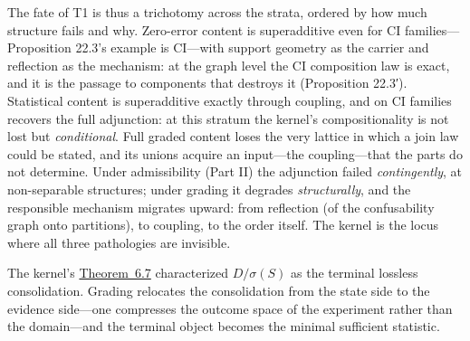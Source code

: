 The fate of T1 is thus a trichotomy across the strata, ordered by how much structure fails and why. Zero-error content is superadditive even for CI families---\hspace{0pt}Proposition 22.3's example is CI---\hspace{0pt}with support geometry as the carrier and reflection as the mechanism: at the graph level the CI composition law is exact, and it is the passage to components that destroys it (Proposition 22.3′). Statistical content is superadditive exactly through coupling, and on CI families recovers the full adjunction: at this stratum the kernel's compositionality is not lost but \emph{conditional}. Full graded content loses the very lattice in which a join law could be stated, and its unions acquire an input---\hspace{0pt}the coupling---\hspace{0pt}that the parts do not determine. Under admissibility (Part II) the adjunction failed \emph{contingently}, at non-separable structures; under grading it degrades \emph{structurally}, and the responsible mechanism migrates upward: from reflection (of the confusability graph onto partitions), to coupling, to the order itself. The kernel is the locus where all three pathologies are invisible.


The kernel's \hyperlink{stmt:6.7}{Theorem~6.7} characterized \(D/\sigma(S)\) as the terminal lossless consolidation. Grading relocates the consolidation from the state side to the evidence side---\hspace{0pt}one compresses the outcome space of the experiment rather than the domain---\hspace{0pt}and the terminal object becomes the minimal sufficient statistic.

